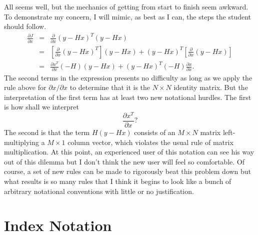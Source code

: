 \documentclass[10pt]{article}
\begin{document}
All seems well, but the mechanics of getting from start to finish seem awkward.  To demonstrate
my concern, I will mimic, as best as I can, the steps the student should follow.
\begin{eqnarray*}
 \frac{\partial J}{\partial x} & = & \frac{\partial}{\partial x} (y - H x)^T (y - H x) \\
                               & = & \left[ \frac{\partial}{\partial x} (y - Hx)^T \right] (y - Hx) + (y - Hx)^T \left[ \frac{\partial}{\partial x} (y - Hx) \right]\\
							   & = & \frac{\partial x^T}{\partial x} (-H)(y - Hx) + (y - Hx)^T (-H) \frac{\partial x}{\partial x}.
\end{eqnarray*}
The second terms in the expression presents no difficulty as long as 
we apply the rule above for $\partial x / \partial x$ to determine that it 
is the $N \times N$ identity matrix.  But the interpretation of the first term 
has at least two new notational hurdles.  
The first is how shall we interpret 
\[
  \frac{\partial x^T}{\partial x} ?
\]
The second is that the term $H (y-Hx)$ consists of an $M \times N$ matrix left-multiplying a $M \times 1$ column vector,
which violates the usual rule of matrix multiplication.
At this point, an experienced user of this notation can see his way out of this dilemma but I don't think
the new user will feel so comfortable.  Of course, a set of new rules can be made to rigorously beat this problem
down but what results is so many rules that I think it begins to look like a bunch of arbitrary
notational conventions with little or no justification.

\section{Index Notation}
\end{document}
